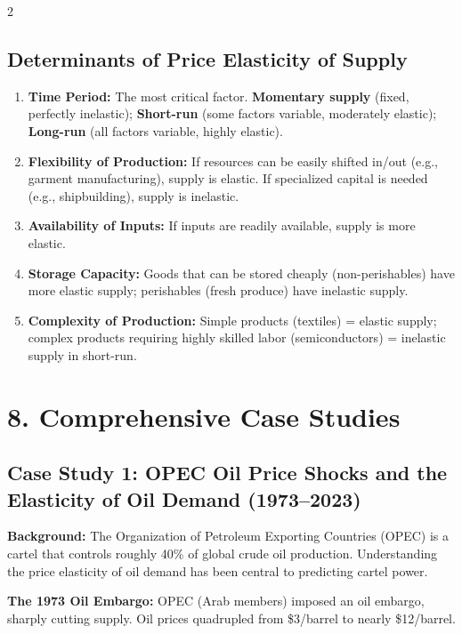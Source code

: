 \documentclass[10pt,a4paper]{article}
\begin{document}
\begin{multicols}{2}
\subsection*{Determinants of Price Elasticity of Supply}
\begin{enumerate}[leftmargin=*,nosep]
    \item \textbf{Time Period:} The most critical factor. \textbf{Momentary supply} (fixed, perfectly inelastic); \textbf{Short-run} (some factors variable, moderately elastic); \textbf{Long-run} (all factors variable, highly elastic).
    \item \textbf{Flexibility of Production:} If resources can be easily shifted in/out (e.g., garment manufacturing), supply is elastic. If specialized capital is needed (e.g., shipbuilding), supply is inelastic.
    \item \textbf{Availability of Inputs:} If inputs are readily available, supply is more elastic.
    \item \textbf{Storage Capacity:} Goods that can be stored cheaply (non-perishables) have more elastic supply; perishables (fresh produce) have inelastic supply.
    \item \textbf{Complexity of Production:} Simple products (textiles) = elastic supply; complex products requiring highly skilled labor (semiconductors) = inelastic supply in short-run.
\end{enumerate}

\section*{8. Comprehensive Case Studies}

\subsection*{Case Study 1: OPEC Oil Price Shocks and the Elasticity of Oil Demand (1973--2023)}

\textbf{Background:} The Organization of Petroleum Exporting Countries (OPEC) is a cartel that controls roughly 40\% of global crude oil production. Understanding the price elasticity of oil demand has been central to predicting cartel power.

\textbf{The 1973 Oil Embargo:} OPEC (Arab members) imposed an oil embargo, sharply cutting supply. Oil prices quadrupled from \$3/barrel to nearly \$12/barrel.


\end{multicols}
\end{document}
